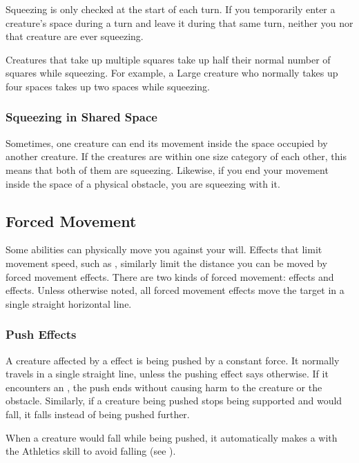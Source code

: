     Squeezing is only checked at the start of each turn.
    If you temporarily enter a creature's space during a turn and leave it during that same turn, neither you nor that creature are ever squeezing.

    Creatures that take up multiple squares take up half their normal number of squares while squeezing.
    For example, a Large creature who normally takes up four spaces takes up two spaces while squeezing.

    \subsubsection{Squeezing in Shared Space}
      Sometimes, one creature can end its movement inside the space occupied by another creature.
      If the creatures are within one size category of each other, this means that both of them are squeezing.
      Likewise, if you end your movement inside the space of a physical obstacle, you are squeezing with it.

  \subsection{Forced Movement}\label{Forced Movement}
    Some abilities can physically move you against your will.
    Effects that limit movement speed, such as , similarly limit the distance you can be moved by forced movement effects.
    There are two kinds of forced movement:  effects and  effects.
    Unless otherwise noted, all forced movement effects move the target in a single straight horizontal line.

    \subsubsection{Push Effects}\label{Push Effects}
      A creature affected by a  effect is being pushed by a constant force.
      It normally travels in a single straight line, unless the pushing effect says otherwise.
      If it encounters an , the push ends without causing harm to the creature or the obstacle.
      Similarly, if a creature being pushed stops being supported and would fall, it falls instead of being pushed further.

      When a creature would fall while being pushed, it automatically makes a  with the Athletics skill to avoid falling (see ).

